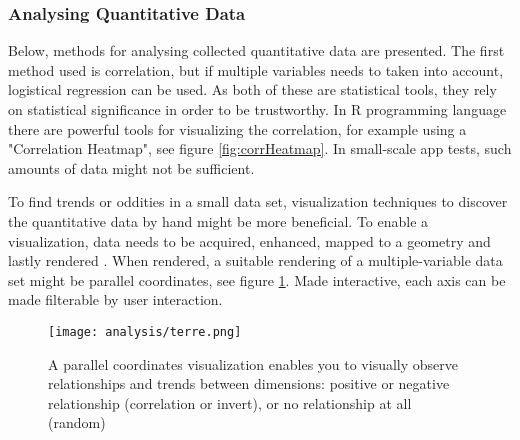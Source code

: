 \subsubsection{Analysing Quantitative Data}
Below, methods for analysing collected quantitative data are presented. The first method used is correlation, but if multiple variables needs to taken into account, logistical regression can be used. As both of these are statistical tools, they rely on statistical significance in order to be trustworthy. In R programming language there are powerful tools for visualizing the correlation, for example using a "Correlation Heatmap", see figure \ref{fig:corrHeatmap}. In small-scale app tests, such amounts of data might not be sufficient.

To find trends or oddities in a small data set, visualization techniques to discover the quantitative data by hand might be more beneficial. To enable a visualization, data needs to be acquired, enhanced, mapped to a geometry and lastly rendered \citep{timo-ropinski-liu}. When rendered, a suitable rendering of a multiple-variable data set might be parallel coordinates, see figure \ref{fig:uneTerre}. Made interactive, each axis can be made filterable by user interaction.

\begin{figure}[h]
    \centering
    \texttt{[image: analysis/terre.png]}
    \caption{A parallel coordinates visualization enables you to visually observe relationships and trends between dimensions: positive or negative relationship (correlation or invert), or no relationship at all (random) \cite{une-terre}}
    \label{fig:uneTerre}
\end{figure}




